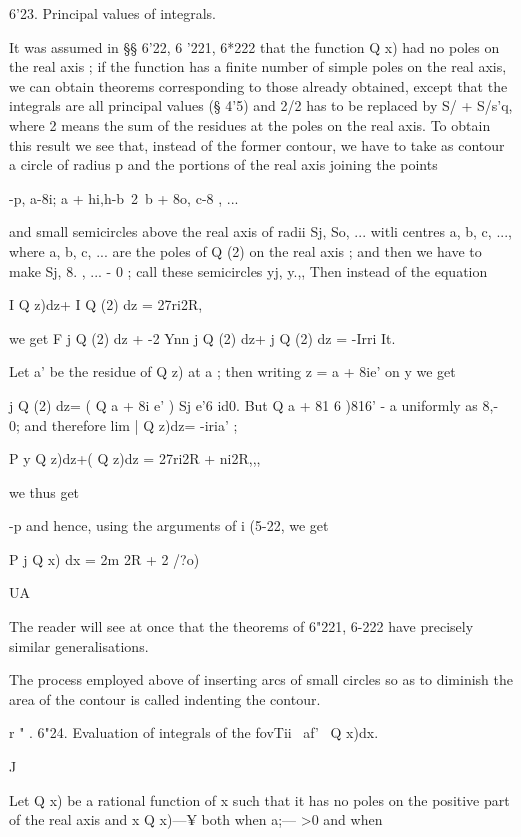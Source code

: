6'23. Principal values of integrals.

It was assumed in §§ 6'22, 6 '221, 6*222 that the function Q x) had no
poles on the real axis ; if the function has a finite number of simple
poles on the real axis, we can obtain theorems corresponding to those
already obtained, except that the integrals are all principal values
(§ 4'5) and 2/2 has to be replaced by S/ + S/s'q, where 2 means the
sum of the residues at the poles on the real axis. To obtain this
result we see that, instead of the former contour, we have to take as
contour a circle of radius p and the portions of the real axis joining
the points

-p, a-8i; a + hi,h-b~2\ b + 8o, c-8 , ...

and small semicircles above the real axis of radii Sj, So, ... witli
centres a, b, c, ..., where a, b, c, ... are the poles of Q (2) on the
real axis ; and then we have to make Sj, 8. , ... - 0 ; call these
semicircles yj, y.,, Then instead of the equation

I Q z)dz+ I Q (2) dz = 27ri2R,

we get F j Q (2) dz + -2 Ynn j Q (2) dz+ j Q (2) dz = -Irri It.

Let a' be the residue of Q z) at a ; then writing z = a + 8ie' on y we
get

j Q (2) dz= ( Q a + 8i e' ) Sj e'6 id0. But Q a + 81 6 )816' - a
uniformly as 8,- 0; and therefore lim | Q z)dz= -iria' ;

P y Q z)dz+( Q z)dz = 27ri2R + ni2R,,,



we thus get



-p and hence, using the arguments of i (5-22, we get



P j Q x) dx = 2m 2R + 2 /?o)



UA



The reader will see at once that the theorems of 6"221, 6-222 have
precisely similar generalisations.

The process employed above of inserting arcs of small circles so as to
diminish the area of the contour is called indenting the contour.

r " . 6"24. Evaluation of integrals of the fovTii \ af'~ Q x)dx.

J

Let Q x) be a rational function of x such that it has no poles on the
positive part of the real axis and x Q x)—¥ both when a;— >0 and when



